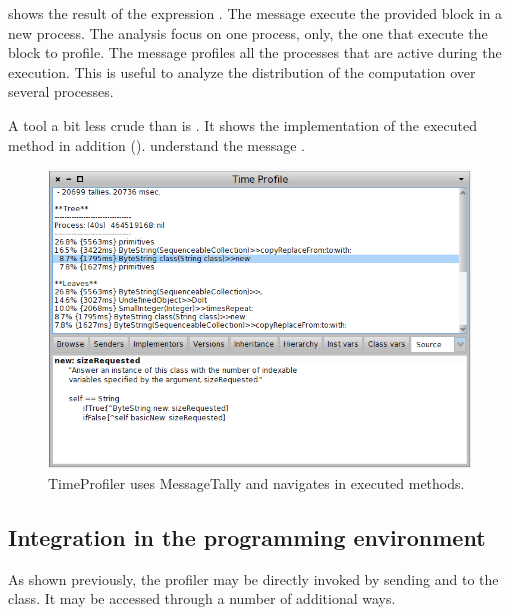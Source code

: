 \documentclass[a4paper,10pt,twoside]{book}
\begin{document}
 shows the result of the expression .
The message  execute the provided block in a new process. The analysis focus on one process, only, the one that execute the block to profile. The message  profiles all the processes that are active during the execution. This is useful to analyze the distribution of the computation over several processes.


A tool a bit less crude than  is . It shows the implementation of the executed method in addition ().   understand the message .

\begin{figure}
	\begin{center}
	\includegraphics[width=.9\linewidth]{TimeProfiler}
	\caption{TimeProfiler uses MessageTally and navigates in executed methods.
}
	\end{center}
\end{figure}


\subsection{Integration in the programming environment}
As shown previously, the profiler may be directly invoked by sending  and  to the  class. It may be accessed through a number of additional ways.
\end{document}
